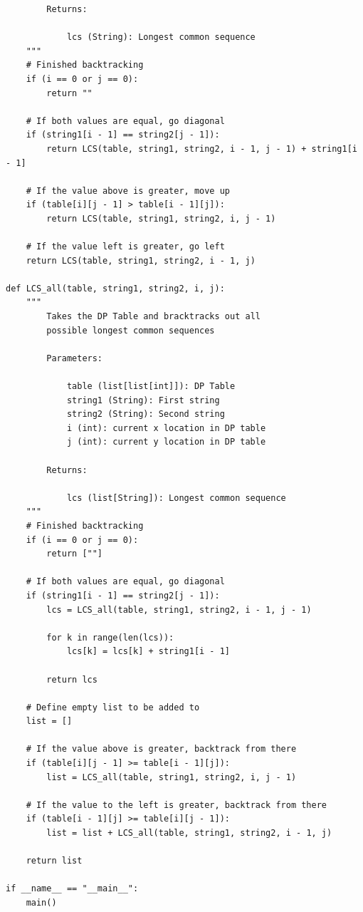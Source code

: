 \documentclass{article}
\begin{document}
\begin{lstlisting}
        Returns:

            lcs (String): Longest common sequence
    """
    # Finished backtracking
    if (i == 0 or j == 0):
        return ""

    # If both values are equal, go diagonal
    if (string1[i - 1] == string2[j - 1]):
        return LCS(table, string1, string2, i - 1, j - 1) + string1[i - 1]

    # If the value above is greater, move up
    if (table[i][j - 1] > table[i - 1][j]):
        return LCS(table, string1, string2, i, j - 1)

    # If the value left is greater, go left
    return LCS(table, string1, string2, i - 1, j)

def LCS_all(table, string1, string2, i, j):
    """
        Takes the DP Table and bracktracks out all 
        possible longest common sequences

        Parameters:

            table (list[list[int]]): DP Table
            string1 (String): First string
            string2 (String): Second string
            i (int): current x location in DP table
            j (int): current y location in DP table

        Returns:

            lcs (list[String]): Longest common sequence
    """
    # Finished backtracking
    if (i == 0 or j == 0):
        return [""]

    # If both values are equal, go diagonal
    if (string1[i - 1] == string2[j - 1]):
        lcs = LCS_all(table, string1, string2, i - 1, j - 1)

        for k in range(len(lcs)):
            lcs[k] = lcs[k] + string1[i - 1]

        return lcs

    # Define empty list to be added to
    list = []

    # If the value above is greater, backtrack from there
    if (table[i][j - 1] >= table[i - 1][j]):
        list = LCS_all(table, string1, string2, i, j - 1)

    # If the value to the left is greater, backtrack from there
    if (table[i - 1][j] >= table[i][j - 1]):
        list = list + LCS_all(table, string1, string2, i - 1, j)

    return list

if __name__ == "__main__":
    main()

\end{lstlisting}
\end{document}
